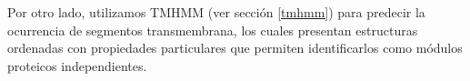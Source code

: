 
Por otro lado, utilizamos TMHMM (ver sección \ref{tmhmm}) para predecir la ocurrencia de segmentos transmembrana, 
los cuales presentan estructuras ordenadas con propiedades particulares que permiten identificarlos como módulos proteicos independientes.





